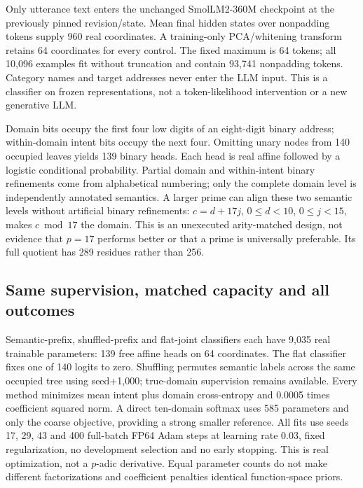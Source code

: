 \documentclass[11pt]{article}
\begin{document}
Only utterance text enters the unchanged SmolLM2-360M checkpoint at the
previously pinned revision/state. Mean final hidden states over nonpadding
tokens supply 960 real coordinates. A training-only PCA/whitening transform
retains 64 coordinates for every control. The fixed maximum is 64 tokens;
all 10,096 examples fit without truncation and contain 93,741 nonpadding
tokens. Category names and target addresses never enter the LLM input.
This is a classifier on frozen representations, not a token-likelihood
intervention or a new generative LLM.

Domain bits occupy the first four low digits of an eight-digit binary
address; within-domain intent bits occupy the next four. Omitting unary
nodes from 140 occupied leaves yields 139 binary heads. Each head is real
affine followed by a logistic conditional probability. Partial domain and
within-intent binary refinements come from alphabetical numbering; only
the complete domain level is independently annotated semantics. A larger
prime can align these two semantic levels without artificial binary
refinements: \(c=d+17j\), \(0\leq d<10\), \(0\leq j<15\), makes
\(c\bmod17\) the domain. This is an unexecuted arity-matched design,
not evidence that \(p=17\) performs better or that a prime is universally
preferable. Its full quotient has 289 residues rather than 256.

\subsection{Same supervision, matched capacity and all outcomes}

Semantic-prefix, shuffled-prefix and flat-joint classifiers each have
9,035 real trainable parameters: 139 free affine heads on 64 coordinates.
The flat classifier fixes one of 140 logits to zero. Shuffling permutes
semantic labels across the same occupied tree using seed+1,000; true-domain
supervision remains available. Every method minimizes mean intent plus
domain cross-entropy and 0.0005 times coefficient squared norm. A direct
ten-domain softmax uses 585 parameters and only the coarse objective,
providing a strong smaller reference. All fits use seeds 17, 29, 43 and
400 full-batch FP64 Adam steps at learning rate 0.03, fixed regularization,
no development selection and no early stopping. This is real optimization,
not a \(p\)-adic derivative. Equal parameter counts do not make different
factorizations and coefficient penalties identical function-space priors.
\end{document}
